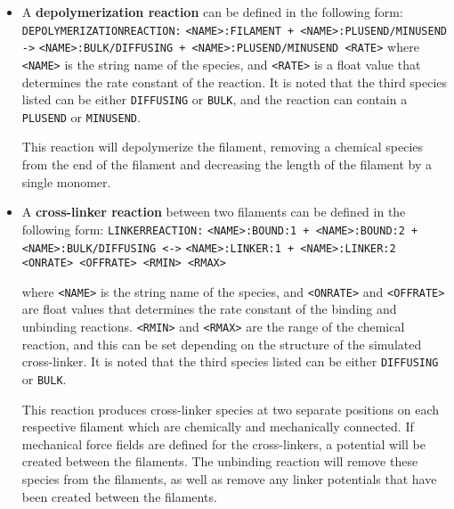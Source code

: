 \documentclass[11pt, oneside]{article}   	%
\begin{document}
\begin{itemize}
\item A \textbf{depolymerization reaction} can be defined in the following form:\newline\newline
\texttt{DEPOLYMERIZATIONREACTION:}\newline
\texttt{<NAME>:FILAMENT + <NAME>:PLUSEND/MINUSEND ->}\newline
\texttt{<NAME>:BULK/DIFFUSING + <NAME>:PLUSEND/MINUSEND <RATE>}\newline\newline
 where \texttt{<NAME>} is the string name of the species, and \texttt{<RATE>} is a float value that determines the rate constant of the reaction. It is noted that the third species listed can be either \texttt{DIFFUSING} or \texttt{BULK}, and the reaction can contain a \texttt{PLUSEND} or \texttt{MINUSEND}.
 
 This reaction will depolymerize the filament, removing a chemical species from the end of the filament and decreasing the length of the filament by a single monomer.

\item A \textbf{cross-linker reaction} between two filaments can be defined in the following form:\newline\newline
\texttt{LINKERREACTION:}\newline
\texttt{<NAME>:BOUND:1 + <NAME>:BOUND:2 + <NAME>:BULK/DIFFUSING <->}\newline
\texttt{<NAME>:LINKER:1 + <NAME>:LINKER:2 <ONRATE> <OFFRATE> <RMIN> <RMAX>}\newline

where \texttt{<NAME>} is the string name of the species, and \texttt{<ONRATE>} and \texttt{<OFFRATE>} are float values that determines the rate constant of the binding and unbinding reactions. \texttt{<RMIN>} and \texttt{<RMAX>} are the range of the chemical reaction, and this can be set depending on the structure of the simulated cross-linker. It is noted that the third species listed can be either \texttt{DIFFUSING} or \texttt{BULK}. 

This reaction produces cross-linker species at two separate positions on each respective filament which are chemically and mechanically connected. If mechanical force fields are defined for the cross-linkers, a potential will be created between the filaments. The unbinding reaction will remove these species from the filaments, as well as remove any linker potentials that have been created between the filaments.


\end{itemize}
\end{document}
